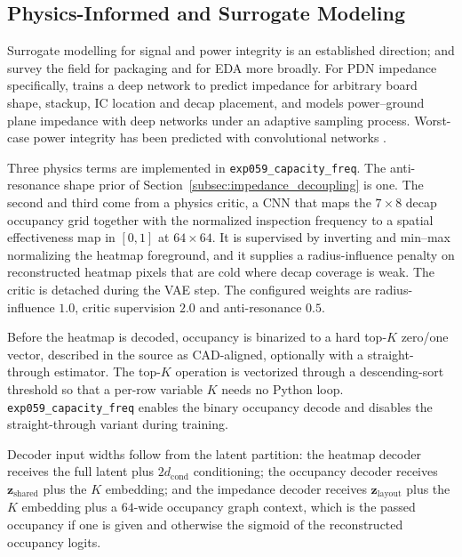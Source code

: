 \subsection{Physics-Informed and Surrogate Modeling}
\label{subsec:physics_surrogate}

Surrogate modelling for signal and power integrity is an established direction;
\cite{swaminathan2020demystifying} and \cite{huang2021ml} survey the field for
packaging and for EDA more broadly. For PDN impedance specifically,
\cite{zhang2021fast} trains a deep network to predict impedance for arbitrary
board shape, stackup, IC location and decap placement, and
\cite{goay2022adaptive} models power--ground plane impedance with deep networks
under an adaptive sampling process. Worst-case power integrity has been predicted
with convolutional networks \cite{todaes2022worst}.


Three physics terms are implemented in \texttt{exp059\_capacity\_freq}. The
anti-resonance shape prior of Section~\ref{subsec:impedance_decoupling} is one.
The second and third come from a physics critic, a CNN that maps the
$7 \times 8$ decap occupancy grid together with the normalized inspection
frequency to a spatial effectiveness map in $[0,1]$ at $64 \times 64$. It is
supervised by inverting and min--max normalizing the heatmap foreground, and it
supplies a radius-influence penalty on reconstructed heatmap pixels that are cold
where decap coverage is weak. The critic is detached during the VAE step. The
configured weights are radius-influence $1.0$, critic supervision $2.0$ and
anti-resonance $0.5$.

Before the heatmap is decoded, occupancy is binarized to a hard top-$K$
zero/one vector, described in the source as CAD-aligned, optionally with a
straight-through estimator. The top-$K$ operation is vectorized through a
descending-sort threshold so that a per-row variable $K$ needs no Python loop.
\texttt{exp059\_capacity\_freq} enables the binary occupancy decode and disables
the straight-through variant during training.

Decoder input widths follow from the latent partition: the heatmap decoder
receives the full latent plus $2 d_{\mathrm{cond}}$ conditioning; the occupancy
decoder receives $\mathbf{z}_{\mathrm{shared}}$ plus the $K$ embedding; and the
impedance decoder receives $\mathbf{z}_{\mathrm{layout}}$ plus the $K$ embedding
plus a $64$-wide occupancy graph context, which is the passed occupancy if one is
given and otherwise the sigmoid of the reconstructed occupancy logits.

